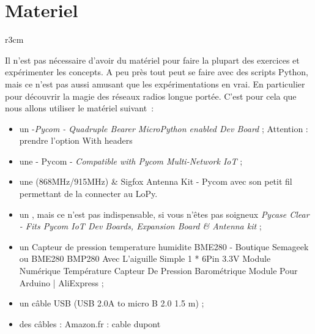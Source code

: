 \clearpage

\section *{Materiel}

 \begin{wrapfigure}{r}{3cm}
\end{wrapfigure}

Il n'est pas nécessaire d'avoir du matériel pour faire la plupart des exercices et expérimenter les concepts. A peu près tout peut se faire avec des scripts Python, mais ce n'est pas aussi amusant que les expérimentations en vrai. En particulier pour découvrir la magie des réseaux radios longue portée. C'est pour cela que nous allons utiliser le matériel suivant~:

\begin{itemize}
\item  un   -\textit{Pycom - Quadruple Bearer MicroPython enabled Dev Board} ; Attention : prendre l'option With headers

\item une   - Pycom - \textit{Compatible with Pycom Multi-Network IoT} ;

\item une  (868MHz/915MHz) & Sigfox Antenna Kit - Pycom avec son petit fil permettant de la connecter au LoPy.

\item un , mais ce n'est pas indispensable, si vous n'êtes pas soigneux \textit{Pycase Clear - Fits Pycom IoT Dev Boards, Expansion Board & Antenna kit} ;

\item un   Capteur de pression temperature humidite BME280 - Boutique Semageek ou  BME280 BMP280 Avec L'aiguille Simple 1 * 6Pin 3.3V Module Numérique Température Capteur De Pression Barométrique Module Pour Arduino | AliExpress ;

\item un câble USB (USB 2.0A to micro B 2.0 1.5 m) ;

\item des câbles  : Amazon.fr : cable dupont
\end{itemize}